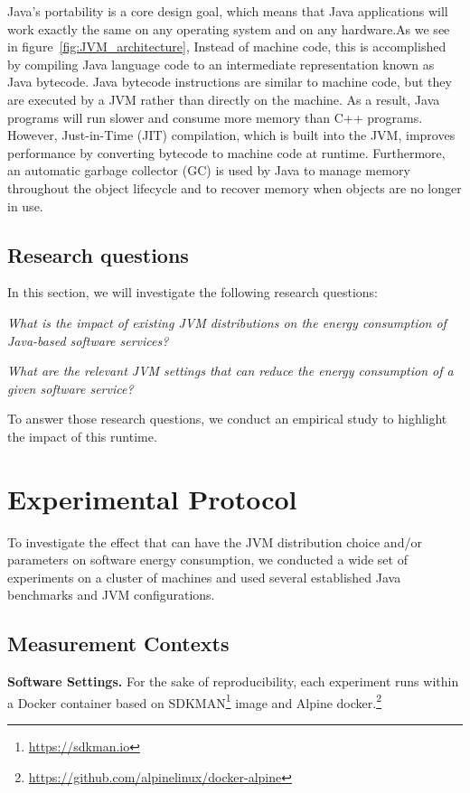 Java's portability is a core design goal, which means that Java applications will work exactly the same on any operating system and on any hardware.As we see in figure~\ref{fig:JVM_architecture}, Instead of machine code, this is accomplished by compiling Java language code to an intermediate representation known as Java bytecode. Java bytecode instructions are similar to machine code, but they are executed by a JVM rather than directly on the machine. As a result, Java programs will run slower and consume more memory than C++ programs. However, Just-in-Time (JIT) compilation, which is built into the JVM, improves performance by converting bytecode to machine code at runtime. Furthermore, an automatic garbage collector (GC) is used by Java to manage memory throughout the object lifecycle and to recover memory when objects are no longer in use.

\subsection{Research questions}
In this section, we will investigate the following research questions:
\begin{compactenum}[\indent\bf RQ\,1:]
    \item \emph{What is the impact of existing JVM distributions on the energy consumption of Java-based software services?}
    \item \emph{What are the relevant JVM settings that can reduce the energy consumption of a given software service?}
\end{compactenum}

To answer those research questions, we conduct an empirical study to highlight the impact of this runtime.

\section{Experimental Protocol}\label{sec:javaprotocol}
To investigate the effect that can have the JVM distribution choice and/or parameters on software energy consumption, we conducted a wide set of experiments on a cluster of machines and used several established Java benchmarks and JVM configurations.

\subsection{Measurement Contexts}

\noindent\textbf{Software Settings.}
For the sake of reproducibility, each experiment runs within a Docker container based on \textsf{SDKMAN}\footnote{\url{https://sdkman.io}} image and Alpine docker.\footnote{\url{https://github.com/alpinelinux/docker-alpine}}

